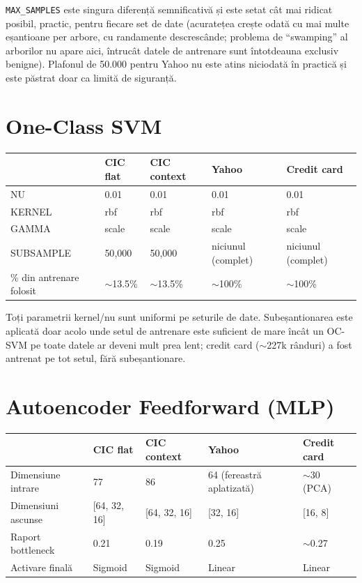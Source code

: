 \texttt{MAX\_SAMPLES} este singura diferență semnificativă și este setat cât mai ridicat posibil, practic, pentru fiecare set de date (acuratețea crește odată cu mai multe eșantioane per arbore, cu randamente descrescânde;
problema de \enquote{swamping} al arborilor nu apare aici, întrucât datele de antrenare sunt întotdeauna exclusiv benigne). Plafonul de 50.000 pentru Yahoo nu este atins niciodată în practică și este păstrat doar ca limită de siguranță.

\section{One-Class SVM}

\begin{center}
\begin{tabular}{@{}lllll@{}}
\toprule
 & CIC flat & CIC context & Yahoo & Credit card \\
\midrule
NU & 0.01 & 0.01 & 0.01 & 0.01 \\
KERNEL & rbf & rbf & rbf & rbf \\
GAMMA & scale & scale & scale & scale \\
SUBSAMPLE & 50{,}000 & 50{,}000 & niciunul (complet) & niciunul (complet) \\
\% din antrenare folosit & $\sim$13.5\% & $\sim$13.5\% & $\sim$100\% & $\sim$100\% \\
\bottomrule
\end{tabular}
\end{center}

Toți parametrii kernel/nu sunt uniformi pe seturile de date. Subeșantionarea este aplicată doar acolo unde setul de antrenare este suficient de mare încât un OC-SVM pe toate datele ar deveni mult prea lent; credit card ($\sim$227k rânduri) a fost antrenat pe tot setul, fără subeșantionare.

\section{Autoencoder Feedforward (MLP)}

\begin{center}
\begin{tabular}{@{}lllll@{}}
\toprule
 & CIC flat & CIC context & Yahoo & Credit card \\
\midrule
Dimensiune intrare & 77 & 86 & 64 (fereastră aplatizată) & $\sim$30 (PCA) \\
Dimensiuni ascunse & [64, 32, 16] & [64, 32, 16] & [32, 16] & [16, 8] \\
Raport bottleneck & 0.21 & 0.19 & 0.25 & $\sim$0.27 \\
Activare finală & Sigmoid & Sigmoid & Linear & Linear \\
\bottomrule
\end{tabular}
\end{center}

